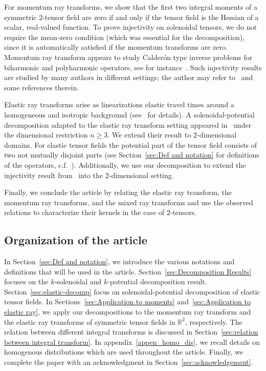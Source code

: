 \documentclass[11pt]{article}
\newcommand{\Rb}{\mathbb{R}}
\begin{document}
For momentum ray transforms, we show that the first two integral moments of a symmetric $2$-tensor field are zero if and only if the tensor field is the Hessian of a scalar, real-valued function. To prove injectivity on solenoidal tensors, we do not require the mean-zero condition (which was essential for the decomposition), since it is automatically satisfied if the momentum transforms are zero. Momentum ray transform appears to study Calder\'on type inverse problems for biharmonic and polyharmonic operators, see for instance~\cite{BKS_Siam,SS_jde,BKSU_nonlinear_cpde}. 
Such injectivity results are studied by many authors in different settings; the author may refer to~\cite{Sharafutdinov_1986_momentum,Rohit_Suman,Kamran_attenuated_mrt,Plamen_Venky,KMSS,JMKS_normal,AKS_ucp,Monard_Efficient_TT,Derevtsov_2023,derevtsov3,Gunther_2013,Hoop_2019,Gunther_Book,Gunther_Mikko} and some references therein.

Elastic ray transforms arise as linearizations elastic travel times around a homogeneous and isotropic background (see~\cite{ilmavirta2025elasticraytransform} for details). A solenoidal-potential decomposition adapted to the elastic ray transform setting appeared in~\cite{ilmavirta2025elasticraytransform} under the dimensional restriction $n \geq 3$.
We extend their result to $2$-dimensional domains. For elastic tensor fields the potential part of the tensor field consists of two not mutually disjoint parts (see Section~\ref{sec:Def and notation} for definitions of the operators, c.f.~\cite{ilmavirta2025elasticraytransform}). Additionally, we use our decomposition to extend the injectivity result from~\cite{ilmavirta2025elasticraytransform} into the $2$-dimensional setting.

Finally, we conclude the article by relating the elastic ray transform, the momentum ray transforms, and the mixed ray transforms and use the observed relations to characterize their kernels in the case of $2$-tensors.


\subsection{Organization of the article}

In Section~\ref{sec:Def and notation}, we introduce the various notations and definitions that will be used in the article. Section~\ref{sec:Decomposition Results} focuses on the $k$-solenoidal and $k$-potential decomposition result. Section~\ref{sec:elastic-decomp} focus on solenoidal-potential decomposition of elastic tensor fields. In Sections~\ref{sec:Application to moments} and~\ref{sec:Application to elastic ray}, we apply our decompositions to the momentum ray transform and the elastic ray transforms of symmetric tensor fields in $\Rb^2$, respectively. The relation between different integral transforms is discussed in Section~\ref{sec:relation between integral transform}. In appendix~\ref{appen_homo_dis}, we recall details on homogenous distributions which are used throughout the article. Finally, we complete the paper with an acknowledgment in Section~\ref{sec:acknowledgement}.
\end{document}
